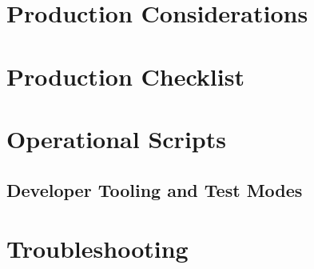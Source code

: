 \documentclass[a4paper,twoside]{sapthesis}
\begin{document}
\section{Production Considerations}
\label{sec:production}

\section{Production Checklist}
\label{sec:production-checklist}

\section{Operational Scripts}
\label{sec:operational-scripts}

\subsection{Developer Tooling and Test Modes}

\section{Troubleshooting}
\label{sec:troubleshooting}


\end{document}
